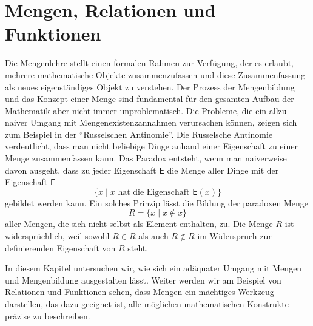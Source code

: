 
\chapter{Mengen, Relationen und Funktionen}

Die Mengenlehre stellt einen formalen Rahmen zur Verfügung, der es erlaubt, mehrere mathematische Objekte
zusammenzufassen und diese Zusammenfassung als neues eigenständiges Objekt zu verstehen. Der Prozess der Mengenbildung und das Konzept einer Menge sind fundamental für den gesamten Aufbau der Mathematik aber nicht immer unproblematisch. Die Probleme, die ein allzu naiver Umgang mit Mengenexistenzannahmen verursachen können, zeigen sich zum Beispiel in der ``Russelschen Antinomie''. Die Russelsche Antinomie verdeutlicht, dass man nicht beliebige Dinge anhand einer Eigenschaft zu einer Menge zusammenfassen kann. Das Paradox entsteht, wenn man naiverweise davon ausgeht, dass zu jeder Eigenschaft $\mathsf{E}$ die Menge aller Dinge mit der Eigenschaft $\mathsf{E}$
\[
\{x\mid x\text{ hat die Eigenschaft } \mathsf{E}(x)\}
\]
 gebildet werden kann. Ein solches Prinzip lässt die Bildung der paradoxen Menge
 \[
 R=\{x\mid x\notin x\}
 \]
aller Mengen, die sich nicht selbst als Element enthalten, zu. Die Menge $R$ ist widersprüchlich, weil sowohl $R\in R$ als auch $R\notin R$ im Widerspruch zur definierenden Eigenschaft von $R$ steht.

In diesem Kapitel untersuchen wir, wie sich ein adäquater Umgang mit Mengen und Mengenbildung ausgestalten lässt. Weiter werden wir am Beispiel von Relationen und Funktionen sehen, dass Mengen ein mächtiges Werkzeug darstellen, das dazu geeignet ist, alle möglichen mathematischen Konstrukte präzise zu beschreiben.


